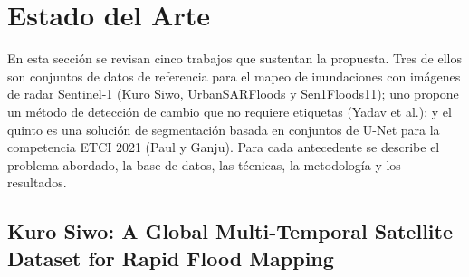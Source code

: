 \documentclass[conference]{IEEEtran}
\begin{document}



\section{Estado del Arte}
\label{sec:estado-del-arte}

En esta sección se revisan cinco trabajos que sustentan la propuesta. Tres de ellos son conjuntos de datos de referencia para el mapeo de inundaciones con imágenes de radar Sentinel-1 (Kuro Siwo, UrbanSARFloods y Sen1Floods11); uno propone un método de detección de cambio que no requiere etiquetas (Yadav et al.); y el quinto es una solución de segmentación basada en conjuntos de U-Net para la competencia ETCI 2021 (Paul y Ganju). Para cada antecedente se describe el problema abordado, la base de datos, las técnicas, la metodología y los resultados.

\subsection{Kuro Siwo: A Global Multi-Temporal Satellite Dataset for Rapid Flood Mapping \cite{bountos2024kurosiwo}}
\end{document}
